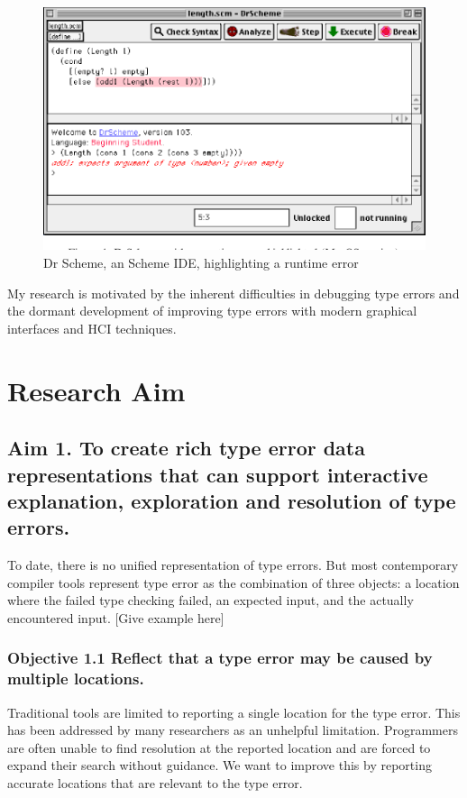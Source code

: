 \begin{figure}[hbt]
  \includegraphics[width=\linewidth]{DrScheme}
  \caption{
    Dr Scheme, an Scheme IDE, highlighting a runtime error
    }
\end{figure}

My research is motivated by the inherent difficulties in debugging type errors and the dormant development of improving type errors with modern graphical interfaces and HCI techniques.

\section{Research Aim}

\subsection{Aim 1. To create rich type error data representations that can support interactive explanation, exploration and resolution of type errors.}

To date, there is no unified representation of type errors. But most contemporary compiler tools represent type error as the combination of three objects: a location where the failed type checking failed, an expected input, and the actually encountered input. [Give example here]

\subsubsection{Objective 1.1 Reflect that a type error may be caused by multiple locations.}

Traditional tools are limited to reporting a single location for the type error. This has been addressed by many researchers as an unhelpful limitation. Programmers are often unable to find resolution at the reported location and are forced to expand their search without guidance. We want to improve this by reporting accurate locations that are relevant to the type error.

